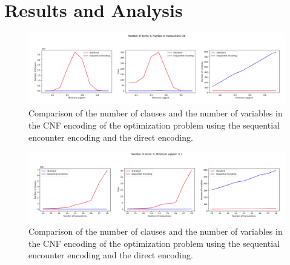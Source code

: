\section{Results and Analysis}

\begin{figure}[H]
    \centering
    \includegraphics[width=1\textwidth]{chapter4/image/n_trans_28.png}
    \caption{Comparison of the number of clauses and the number of variables in the CNF encoding of the optimization problem using the sequential encounter encoding and the direct encoding.}
    \label{fig:4_1}
\end{figure}

\begin{figure}[H]
    \centering
    \includegraphics[width=1\textwidth]{chapter4/image/min_supp_0.7.png}
    \caption{Comparison of the number of clauses and the number of variables in the CNF encoding of the optimization problem using the sequential encounter encoding and the direct encoding.}
    \label{fig:4_2}
\end{figure}
